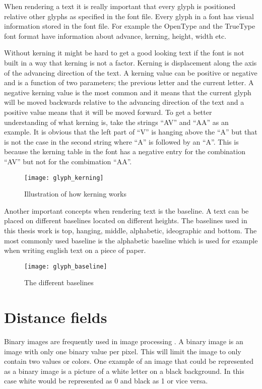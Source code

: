 When rendering a text it is really important that every glyph is positioned relative other glyphs as specified in the font file. Every glyph in a font has visual information stored in the font file. For example the OpenType and the TrueType\texttrademark{} font format have information about advance, kerning, height, width etc\citep{OpenType, TrueType}.

Without kerning it might be hard to get a good looking text if the font is not built in a way that kerning is not a factor. Kerning is displacement along the axis of the advancing direction of the text. A kerning value can be positive or negative and is a function of two parameters; the previous letter and the current letter. A negative kerning value is the most common and it means that the current glyph will be moved backwards relative to the advancing direction of the text and a positive value means that it will be moved forward. To get a better understanding of what kerning is, take the strings ``AV'' and ``AA'' as an example. It is obvious that the left part of ``V'' is hanging above the ``A'' but that is not the case in the second string where ``A'' is followed by an ``A''. This is because the kerning table in the font has a negative entry for the combination ``AV'' but not for the combimation ``AA''. \citep{FreeTypeKern}

\begin{figure}[H]
\texttt{[image: glyph\_kerning]}
\caption{Illustration of how kerning works}
\end{figure}

Another important concepts when rendering text is the baseline. A text can be placed on different baselines located on different heights. The baselines used in this thesis work is top, hanging, middle, alphabetic, ideographic and bottom. The most commonly used baseline is the alphabetic baseline which is used for example when writing english text on a piece of paper.

\begin{figure}[H]
\texttt{[image: glyph\_baseline]}
\caption{The different baselines}
\end{figure}

\section{Distance fields}\label{distancefield}
Binary images are frequently used in image processing \citep{Ragnemalm:1993}. A binary image is an image with only one binary value per pixel. This will limit the image to only contain two values or colors. One example of an image that could be represented as a binary image is a picture of a white letter on a black background. In this case white would be represented as 0 and black as 1 or vice versa.

